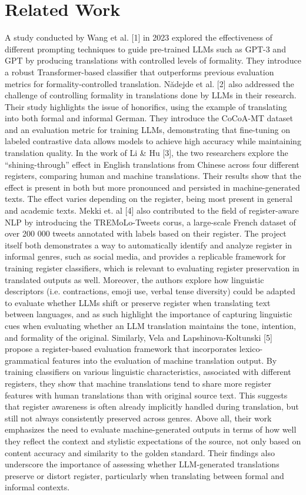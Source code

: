 \documentclass[fleqn,moreauthors,10pt]{ds_report}
\begin{document}
	\section*{Related Work}
	A study conducted by Wang et al. [1] in 2023 explored the effectiveness of different prompting techniques to guide pre-trained LLMs such as GPT-3 and GPT by producing translations with controlled levels of formality. They introduce a robust Transformer-based classifier that outperforms previous evaluation metrics for formality-controlled translation. N\u{a}dejde et al. [2] also addressed the challenge of controlling formality in translations done by LLMs in their research. Their study highlights the issue of honorifics, using the example of translating \grqq into both formal and informal German. They introduce the CoCoA-MT dataset and an evaluation metric for training LLMs, demonstrating that fine-tuning on labeled contrastive data allows models to achieve high accuracy while maintaining translation quality. 
	In the work of Li \& Hu [3], the two researchers explore the “shining-through” effect in English translations from Chinese across four different registers, comparing human and machine translations. Their results show that the effect is present in both but more pronounced and persisted in machine-generated texts. The effect varies depending on the register, being most present in general and academic texts. 
	Mekki et. al [4] also contributed to the field of register-aware NLP by introducing the TREMoLo-Tweets corus, a large-scale French dataset of over 200 000 tweets annotated with labels based on their register. The project itself both demonstrates a way to automatically identify and analyze register in informal genres, such as social media, and provides a replicable framework for training register classifiers, which is relevant to evaluating register preservation in translated outputs as well. Moreover, the authors explore how linguistic descriptors (i.e. contractions, emoji use, verbal tense diversity) could be adapted to evaluate whether LLMs shift or preserve register when translating text between languages, and as such highlight the importance of capturing linguistic cues when evaluating whether an LLM translation maintains the tone, intention, and formality of the original.
	Similarly, Vela and Lapshinova-Koltunski [5] propose a register-based evaluation framework that incorporates lexico-grammatical features into the evaluation of machine translation output. By training classifiers on various linguistic characteristics, associated with different registers, they show that machine translations tend to share more register features with human translations than with original source text. This suggests that register awareness is often already implicitly handled during translation, but still not always consistently preserved across genres. Above all, their work emphasizes the need to evaluate machine-generated outputs in terms of how well they reflect the context and stylistic expectations of the source, not only based on content accuracy and similarity to the golden standard. Their findings also underscore the importance of assessing whether LLM-generated translations preserve or distort register, particularly when translating between formal and informal contexts.
	
\end{document}
